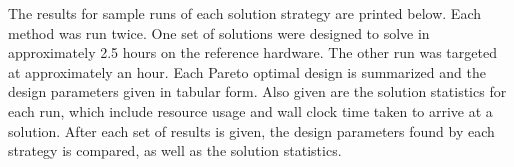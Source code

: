 The results for sample runs of each solution strategy are printed below. Each method was run twice. One set of solutions were designed to solve in approximately 2.5 hours on the reference hardware. The other run was targeted at approximately an hour. Each Pareto optimal design is summarized and the design parameters given in tabular form. Also given are the solution statistics for each run, which include resource usage and wall clock time taken to arrive at a solution. After each set of results is given, the design parameters found by each strategy is compared, as well as the solution statistics. 
